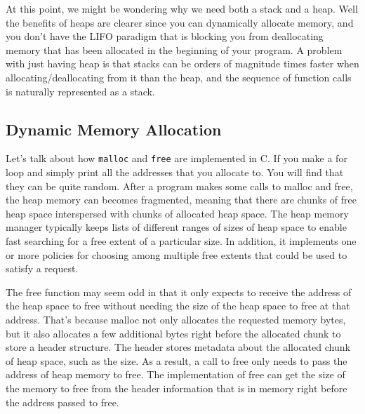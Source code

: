 \documentclass{article}
\begin{document}
    At this point, we might be wondering why we need both a stack and a heap. Well the benefits of heaps are clearer since you can dynamically allocate memory, and you don't have the LIFO paradigm that is blocking you from deallocating memory that has been allocated in the beginning of your program. A problem with just having heap is that stacks can be orders of magnitude times faster when allocating/deallocating from it than the heap, and the sequence of function calls is naturally represented as a stack. 

  \subsection{Dynamic Memory Allocation}

    Let's talk about how \texttt{malloc} and \texttt{free} are implemented in C. If you make a for loop and simply print all the addresses that you allocate to. You will find that they can be quite random. After a program makes some calls to malloc and free, the heap memory can becomes fragmented, meaning that there are chunks of free heap space interspersed with chunks of allocated heap space. The heap memory manager typically keeps lists of different ranges of sizes of heap space to enable fast searching for a free extent of a particular size. In addition, it implements one or more policies for choosing among multiple free extents that could be used to satisfy a request.

    The free function may seem odd in that it only expects to receive the address of the heap space to free without needing the size of the heap space to free at that address. That’s because malloc not only allocates the requested memory bytes, but it also allocates a few additional bytes right before the allocated chunk to store a header structure. The header stores metadata about the allocated chunk of heap space, such as the size. As a result, a call to free only needs to pass the address of heap memory to free. The implementation of free can get the size of the memory to free from the header information that is in memory right before the address passed to free.
\end{document}
